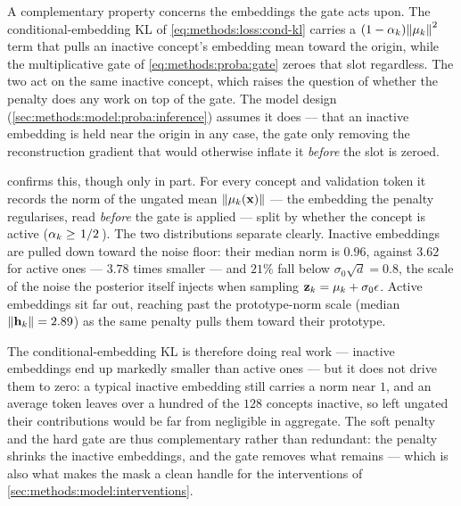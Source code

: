 A complementary property concerns the embeddings the gate acts upon. The
conditional-embedding \ac{KL} of \cref{eq:methods:loss:cond-kl}
carries a $(1 - \alpha_k) \norm{\vb{\mu}_k}^2$ term that pulls an inactive
concept's embedding mean toward the origin, while the multiplicative gate of
\cref{eq:methods:proba:gate} zeroes that slot regardless. The
two act on the same inactive concept, which raises the question of whether the
penalty does any work on top of the gate. The model design
(\cref{sec:methods:model:proba:inference})
assumes it does --- that an inactive embedding is held near the origin in any
case, the gate only removing the reconstruction gradient that would otherwise
inflate it \textit{before} the slot is zeroed.

confirms this, though only in part. For every concept and validation token it
records the norm of the ungated mean $\norm{\vb{\mu}_k(\vb{x})}$ --- the
embedding the penalty regularises, read \textit{before} the gate is applied ---
split by whether the concept is active ($\alpha_k \ge \flatfrac{1}{2}$). The two
distributions separate clearly. Inactive embeddings are pulled down toward the
noise floor: their median norm is $0.96$, against $3.62$ for active ones ---
$3.78$ times smaller --- and $21\%$ fall below $\sigma_0 \sqrt{d} = 0.8$, the
scale of the noise the posterior itself injects when sampling $\vb{z}_k =
\vb{\mu}_k + \sigma_0 \vb{\epsilon}$. Active embeddings sit far out, reaching
past the prototype-norm scale (median $\norm{\vb{h}_k} = 2.89$) as the same
penalty pulls them toward their prototype.

The conditional-embedding \ac{KL} is therefore doing real work --- inactive
embeddings end up markedly smaller than active ones --- but it does not drive
them to zero: a typical inactive embedding still carries a norm near $1$, and an
average token leaves over a hundred of the $128$ concepts inactive, so left
ungated their contributions would be far from negligible in aggregate. The soft
penalty and the hard gate are thus complementary rather than redundant: the
penalty shrinks the inactive embeddings, and the gate removes what remains ---
which is also what makes the mask a clean handle for the interventions of
\cref{sec:methods:model:interventions}.

